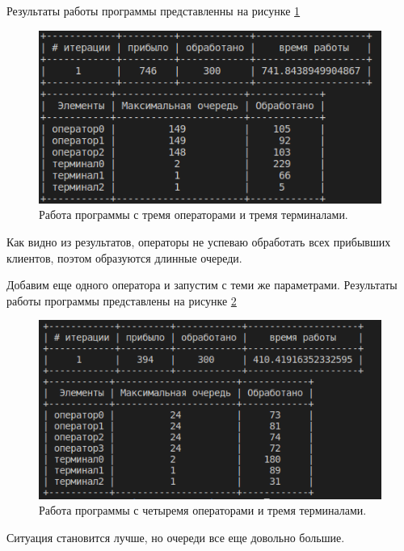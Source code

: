 \documentclass[14pt]{extreport}
\begin{document}
Результаты работы программы представленны на рисунке \ref{img:res1}

\begin{figure}[H]
	\begin{center}
		\includegraphics[scale=1.0]{imgs/res1.png}
	\end{center}
	\caption{Работа программы с тремя операторами и тремя терминалами.}
	\label{img:res1}
\end{figure}

Как видно из результатов, операторы не успеваю обработать всех прибывших клиентов, поэтом образуются длинные очереди. 

Добавим еще одного оператора и запустим с теми же параметрами. Результаты работы программы представлены на рисунке \ref{img:res2}

\begin{figure}[H]
	\begin{center}
		\includegraphics[scale=1.0]{imgs/res2.png}
	\end{center}
	\caption{Работа программы с четыремя операторами и тремя терминалами.}
	\label{img:res2}
\end{figure}

Ситуация становится лучше, но очереди все еще довольно большие. 
\end{document}
